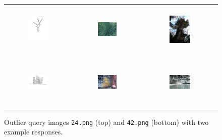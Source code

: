 \begin{figure}[h]
    \centering
    \begin{tabular}{ccc}
        \includegraphics[width=0.3\textwidth,height=2.5cm,keepaspectratio=true]{illustrations/image_examples/sketch_24.png} &
        \includegraphics[width=0.3\textwidth,height=2.5cm,keepaspectratio=true]{illustrations/image_examples/result_24_1.jpg} &
        \includegraphics[width=0.3\textwidth,height=2.5cm,keepaspectratio=true]{illustrations/image_examples/result_24_2.jpg} \\
        \includegraphics[width=0.3\textwidth,height=2.5cm,keepaspectratio=true]{illustrations/image_examples/sketch_42.png} &
        \includegraphics[width=0.3\textwidth,height=2.5cm,keepaspectratio=true]{illustrations/image_examples/result_42_1.jpg} &
        \includegraphics[width=0.3\textwidth,height=2.5cm,keepaspectratio=true]{illustrations/image_examples/result_42_2.jpg}
    \end{tabular}
    \caption[Outlier query images]{
        Outlier query images \texttt{24.png} (top) and \texttt{42.png} (bottom)
        with two example responses.
    }
    \label{fig:results_distribution_outliers}
\end{figure}

\FloatBarrier
